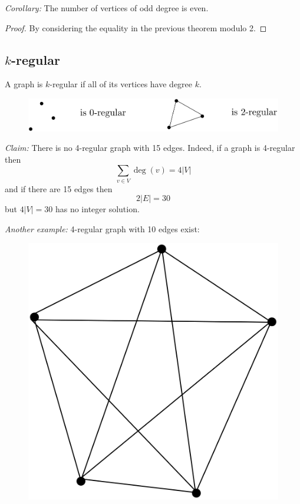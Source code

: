 \documentclass[11pt]{article}
\begin{document}
    \emph{Corollary:} The number of vertices of odd degree is even.
    \begin{proof}
        By considering the equality in the previous theorem modulo 2.
    \end{proof}

    \subsection{$k$-regular}

    A graph is $k$-regular if all of its vertices have degree $k$.
    \begin{figure}[H]
        \centering
        \includegraphics[scale=0.2]{kregular.png}
    \end{figure}

    \emph{Claim:} There is no 4-regular graph with 15 edges. Indeed, if a graph is 4-regular then \[\sum_{v \in V} \deg(v) = 4 |V|\] and if there are 15 edges then \[2|E| = 30\] but \(4|V| = 30\) has no integer solution.

    \vspace{1em}

    \emph{Another example:} 4-regular graph with 10 edges exist:
    \begin{figure}[H]
        \centering
        \includegraphics[scale=0.1]{4reg.png}
    \end{figure}
\end{document}

